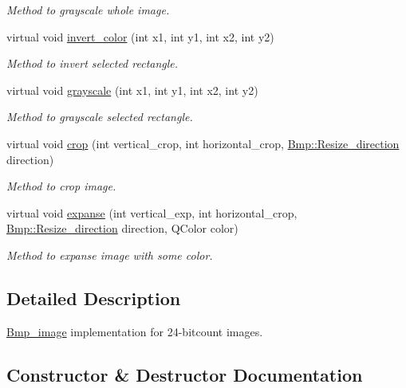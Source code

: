 \begin{DoxyCompactItemize}
\begin{DoxyCompactList}\small\item\em Method to grayscale whole image. \end{DoxyCompactList}\item 
virtual void \hyperlink{classBmp__image24_a428263c22edd8305804f079611a790c4}{invert\+\_\+color} (int x1, int y1, int x2, int y2)
\begin{DoxyCompactList}\small\item\em Method to invert selected rectangle. \end{DoxyCompactList}\item 
virtual void \hyperlink{classBmp__image24_a0e4ceb95e6b1ecd4f04ea2a025682591}{grayscale} (int x1, int y1, int x2, int y2)
\begin{DoxyCompactList}\small\item\em Method to grayscale selected rectangle. \end{DoxyCompactList}\item 
virtual void \hyperlink{classBmp__image24_a67fc5d7ff1d4d1886bf75b0cc56c8f4f}{crop} (int vertical\+\_\+crop, int horizontal\+\_\+crop, \hyperlink{namespaceBmp_a17aedbe2a7f4fccdb8542a417187eea7}{Bmp\+::\+Resize\+\_\+direction} direction)
\begin{DoxyCompactList}\small\item\em Method to crop image. \end{DoxyCompactList}\item 
virtual void \hyperlink{classBmp__image24_a98e984b9e2edba193c5abe1a8372f0a8}{expanse} (int vertical\+\_\+exp, int horizontal\+\_\+crop, \hyperlink{namespaceBmp_a17aedbe2a7f4fccdb8542a417187eea7}{Bmp\+::\+Resize\+\_\+direction} direction, Q\+Color color)
\begin{DoxyCompactList}\small\item\em Method to expanse image with some color. \end{DoxyCompactList}\end{DoxyCompactItemize}


\subsection{Detailed Description}
\hyperlink{classBmp__image}{Bmp\+\_\+image} implementation for 24-\/bitcount images. 

\subsection{Constructor \& Destructor Documentation}
